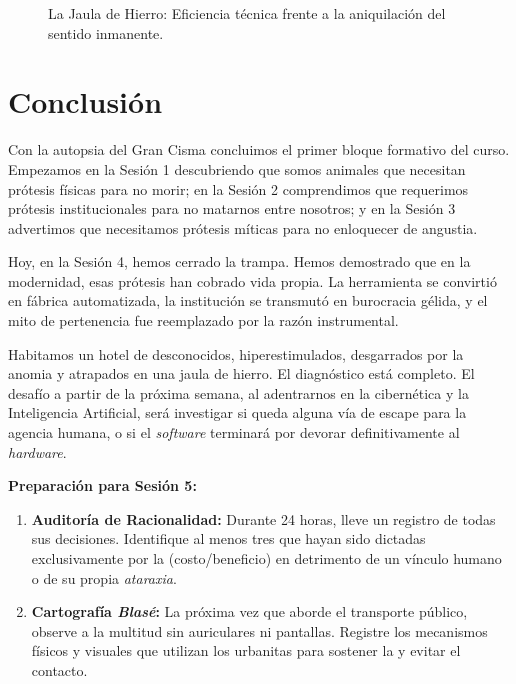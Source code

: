 \begin{figure}[htbp]
    \centering
    
    \caption{La Jaula de Hierro: Eficiencia técnica frente a la aniquilación del sentido inmanente.}
    \label{fig:asintota_weber}
\end{figure}

\section{Conclusión}

Con la autopsia del Gran Cisma concluimos el primer bloque formativo del curso. Empezamos en la Sesión 1 descubriendo que somos animales que necesitan prótesis físicas para no morir; en la Sesión 2 comprendimos que requerimos prótesis institucionales para no matarnos entre nosotros; y en la Sesión 3 advertimos que necesitamos prótesis míticas para no enloquecer de angustia. 

Hoy, en la Sesión 4, hemos cerrado la trampa. Hemos demostrado que en la modernidad, esas prótesis han cobrado vida propia. La herramienta se convirtió en fábrica automatizada, la institución se transmutó en burocracia gélida, y el mito de pertenencia fue reemplazado por la razón instrumental. 

Habitamos un hotel de desconocidos, hiperestimulados, desgarrados por la anomia y atrapados en una jaula de hierro. El diagnóstico está completo. El desafío a partir de la próxima semana, al adentrarnos en la cibernética y la Inteligencia Artificial, será investigar si queda alguna vía de escape para la agencia humana, o si el \textit{software} terminará por devorar definitivamente al \textit{hardware}.

\begin{actividad}
\textbf{Preparación para Sesión 5:}
\begin{enumerate}
    \item \textbf{Auditoría de Racionalidad:} Durante 24 horas, lleve un registro de todas sus decisiones. Identifique al menos tres que hayan sido dictadas exclusivamente por la \RacionalidadInstrumental{} (costo/beneficio) en detrimento de un vínculo humano o de su propia \textit{ataraxia}.
    \item \textbf{Cartografía \textit{Blasé}:} La próxima vez que aborde el transporte público, observe a la multitud sin auriculares ni pantallas. Registre los mecanismos físicos y visuales que utilizan los urbanitas para sostener la \ActitudBlase{} y evitar el contacto.
\end{enumerate}
\end{actividad}